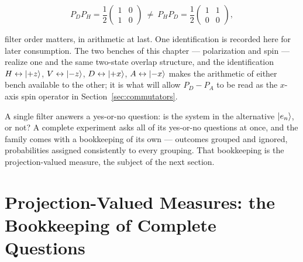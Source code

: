 \begin{linenomath}
    \begin{equation}
        P_D P_H = \frac12
        \begin{pmatrix}
            1 & 0\\
            1 & 0
        \end{pmatrix}
        \ \neq\
        P_H P_D = \frac12
        \begin{pmatrix}
            1 & 1\\
            0 & 0
        \end{pmatrix} ,
    \end{equation}
\end{linenomath}
filter order matters, in arithmetic at last. One identification is recorded here for later consumption. The two benches of this chapter --- polarization and spin --- realize one and the same two-state overlap structure, and the identification $H\leftrightarrow\ket{+z}$, $V\leftrightarrow\ket{-z}$, $D\leftrightarrow\ket{+x}$, $A\leftrightarrow\ket{-x}$ makes the arithmetic of either bench available to the other; it is what will allow $P_D - P_A$ to be read as the $x$-axis spin operator in Section~\ref{sec:commutators}.

A single filter answers a yes-or-no question: is the system in the alternative $\ket{e_n}$, or not? A complete experiment asks all of its yes-or-no questions at once, and the family comes with a bookkeeping of its own --- outcomes grouped and ignored, probabilities assigned consistently to every grouping. That bookkeeping is the projection-valued measure, the subject of the next section.

\section{Projection-Valued Measures: the Bookkeeping of Complete Questions}
\label{sec:pvm}

